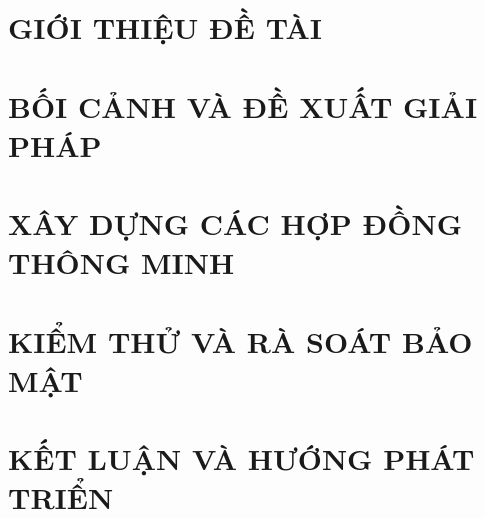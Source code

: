 \documentclass[a4paper,13pt,3p,twoside]{report}
\theoremstyle{definition}
\begin{document}
\renewcommand{\listtablename}{DANH MỤC BẢNG BIỂU}
{\let\oldnumberline\numberline
\renewcommand{\numberline}{Bảng~\oldnumberline}
\listoftables}

\glsaddall 
 \renewcommand*{\glossaryname}{Danh sách thuật ngữ}
\renewcommand*{\acronymname}{DANH MỤC THUẬT NGỮ VÀ TỪ VIẾT TẮT}
\renewcommand*{\entryname}{Thuật ngữ}
\renewcommand*{\descriptionname}{Ý nghĩa}
\printnoidxglossaries


% 


\newpage
{}

\pagestyle{fancy}
\fancyhf{}
\fancyhead[RE, LO]{\leftmark}
\fancyfoot[RE, LO]{\thepage}

\chapter{GIỚI THIỆU ĐỀ TÀI}
\label{chapter:Introduction}

\newpage
\chapter{BỐI CẢNH VÀ ĐỀ XUẤT GIẢI PHÁP}
\label{chapter:Related_works}

\newpage
\chapter{XÂY DỰNG CÁC HỢP ĐỒNG THÔNG MINH}
\label{chapter:Experiment}

\newpage
\chapter{KIỂM THỬ VÀ RÀ SOÁT BẢO MẬT}
\label{chapter:Methodology}

\newpage
\chapter{KẾT LUẬN VÀ HƯỚNG PHÁT TRIỂN}
\label{chapter:conclusion}
\end{document}
